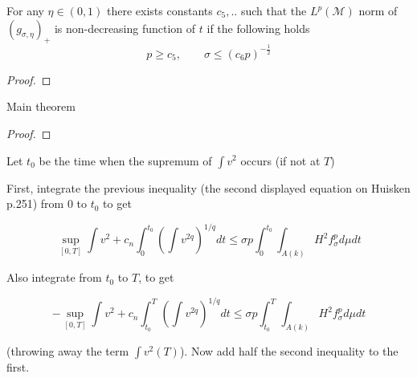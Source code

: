     \begin{proposition}
        For any $ \eta \in (0,1) $ there exists constants $ c_{5},.. $ such that the $ L^{p}( \mathcal{M}) $ norm of $ (g_{\sigma, \eta})_{+} $ is non-decreasing function of $ t $ if the following holds 
        \[ p \ge c_{5}, \qquad \sigma \le (c_{6}p)^{- \frac{1}{2}} \]
        
    \end{proposition}
    \begin{proof}
        
    \end{proof}

    \begin{thm}
        Main theorem
    \end{thm}
    \begin{proof}
        
    \end{proof}
    Let $t_0$ be the time when the supremum of $\int v^2$ occurs (if not at $T$)

 

First, integrate the previous inequality (the second displayed equation on Huisken p.251) from $0$ to $t_0$ to get

$$
\sup_{[0,T]}\int v^2 + c_n\int_0^{t_0}(\int v^{2q})^{1/q}dt\leq \sigma p\int_0^{t_0}\int_{A(k)}H^2f_\sigma^pd\mu dt
$$

Also integrate from $t_0$ to $T$, to get

$$
-\sup_{[0,T]}\int v^2+c_n\int_{t_0}^{T}(\int v^{2q})^{1/q}dt\leq \sigma p\int_{t_0}^{T}\int_{A(k)}H^2f_\sigma^pd\mu dt
$$

(throwing away the term $\int v^2(T)$).  Now add half the second inequality to the first.